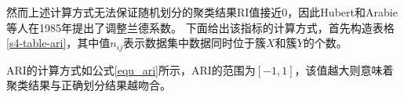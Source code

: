 然而上述计算方式无法保证随机划分的聚类结果RI值接近0，因此Hubert和Arabie等人在1985年提出了调整兰德系数。
下面给出该指标的计算方式，首先构造表格\ref{s4-table-ari}，其中值$ n_{ij} $表示数据集中数据同时位于簇$ X $和簇$ Y $的个数。

\begin{table}[htbp]
	\centering
	\renewcommand{\arraystretch}{1.3}
	\caption{ARI指标计算中间值}
	\label{s4-table-ari}
\end{table}

ARI的计算方式如公式\ref{equ_ari}所示，ARI的范围为$ [-1,1] $，该值越大则意味着聚类结果与正确划分结果越吻合。

